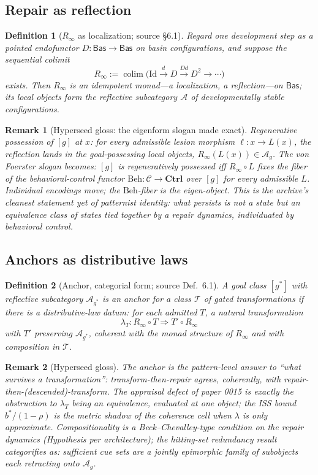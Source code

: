 \documentclass[11pt]{article}
\newtheorem{definition}{Definition}
\newtheorem{remark}{Remark}
\newcommand{\D}{D}
\newcommand{\T}{\mathcal{T}}
\newcommand{\A}{\mathcal{A}}
\newcommand{\Rinf}{R_{\infty}}
\newcommand{\Beh}{\mathrm{Beh}}
\newcommand{\Ctrl}{\mathbf{Ctrl}}
\newcommand{\Bas}{\mathsf{Bas}}
\newcommand{\C}{\mathcal{C}}
\begin{document}
\subsection{Repair as reflection}

\begin{definition}[$\Rinf$ as localization; source \S6.1]\label{def:rinf}
Regard one development step as a pointed endofunctor $\D : \Bas \to \Bas$ on basin
configurations, and suppose the sequential colimit
\[
\Rinf := \operatorname{colim}\bigl( \mathrm{Id} \xrightarrow{d} \D \xrightarrow{\D d} \D^2 \to \cdots \bigr)
\]
exists. Then $\Rinf$ is an idempotent monad---a localization, a reflection---on $\Bas$;
its local objects form the reflective subcategory $\A$ of developmentally stable
configurations.
\end{definition}

\begin{remark}[Hyperseed gloss: the eigenform slogan made exact]
Regenerative possession of $[g]$ at $x$: for every admissible lesion morphism
$\ell : x \to L(x)$, the reflection lands in the goal-possessing local objects,
$\Rinf(L(x)) \in \A_g$. The von Foerster slogan becomes:
$[g]$ is regeneratively possessed iff $\Rinf \circ L$ fixes the fiber of the
behavioral-control functor $\Beh : \C \to \Ctrl$ over $[g]$ for every admissible $L$.
\emph{Individual encodings move; the $\Beh$-fiber is the eigen-object.} This is the
archive's cleanest statement yet of patternist identity: what persists is not a state
but an equivalence class of states tied together by a repair dynamics, individuated by
behavioral control.
\end{remark}

\subsection{Anchors as distributive laws}

\begin{definition}[Anchor, categorial form; source Def.~6.1]\label{def:anchor}
A goal class $[g^{*}]$ with reflective subcategory $\A_{g^{*}}$ is an \emph{anchor} for
a class $\T$ of gated transformations if there is a distributive-law datum: for each
admitted $T$, a natural transformation
\[
\lambda_T : \Rinf \circ T \Longrightarrow T' \circ \Rinf
\]
with $T'$ preserving $\A_{g^{*}}$, coherent with the monad structure of $\Rinf$ and
with composition in $\T$.
\end{definition}

\begin{remark}[Hyperseed gloss]
The anchor is the pattern-level answer to ``what survives a transformation'':
transform-then-repair agrees, coherently, with repair-then-(descended)-transform. The
appraisal defect of paper 0015 is exactly the obstruction to $\lambda_T$ being an
equivalence, evaluated at one object; the ISS bound $b^{*}/(1-\rho)$ is the metric
shadow of the coherence cell when $\lambda$ is only approximate. Compositionality is a
Beck--Chevalley-type condition on the repair dynamics (Hypothesis per architecture);
the hitting-set redundancy result categorifies as: sufficient cue sets are a jointly
epimorphic family of subobjects each retracting onto $\A_g$.
\end{remark}
\end{document}
